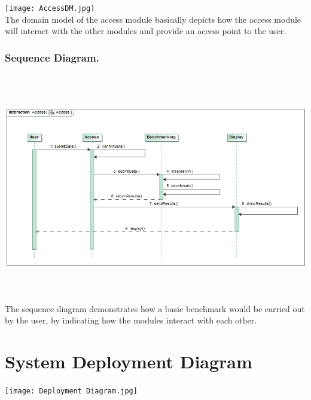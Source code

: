 \documentclass[runningheads,a4paper]{article}
\begin{document}
\texttt{[image: AccessDM.jpg]}  \\
The domain model of the access module basically depicts how the access module will interact with the other modules and provide an access point to the user.
\subsubsection{\textbf{Sequence Diagram.}}
\includegraphics[width=15cm , height=10cm]{AccessSD.jpg}  \\
The sequence diagram demonstrates how a basic benchmark would be carried out by the user, by indicating how the modules interact with each other.

\section{System Deployment Diagram}
\texttt{[image: Deployment Diagram.jpg]} \\
\end{document}
